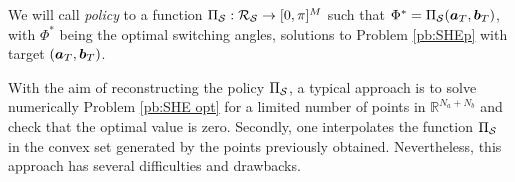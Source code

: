 \documentclass[twocolumn]{autart}    %
\begin{document}
\vspace{0.5em}
\begin{definition}[Policy]\label{def:policy}
We will call \emph{policy} to a function $\Pi_{\mathcal{S}}: \mathcal{R}_{\mathcal{S}} \rightarrow [0,\pi]^M$ such that $\Phi^* = \Pi_{\mathcal{S}}(\bm{a}_T,\bm{b}_T)$, with $\Phi^*$ being the optimal switching angles, solutions to Problem \ref{pb:SHEp} with target $(\bm{a}_T,\bm{b}_T)$.
\end{definition} 

With the aim of reconstructing the policy $\Pi_{\mathcal{S}}$, a typical approach is to solve numerically Problem \ref{pb:SHE opt} for a limited number of points in $\mathbb{R}^{N_a+N_b}$ and check that the optimal value is zero. Secondly, one interpolates the function $\Pi_{\mathcal{S}}$ in the convex set generated by the points previously obtained. Nevertheless, this approach has several difficulties and drawbacks.
\end{document}
